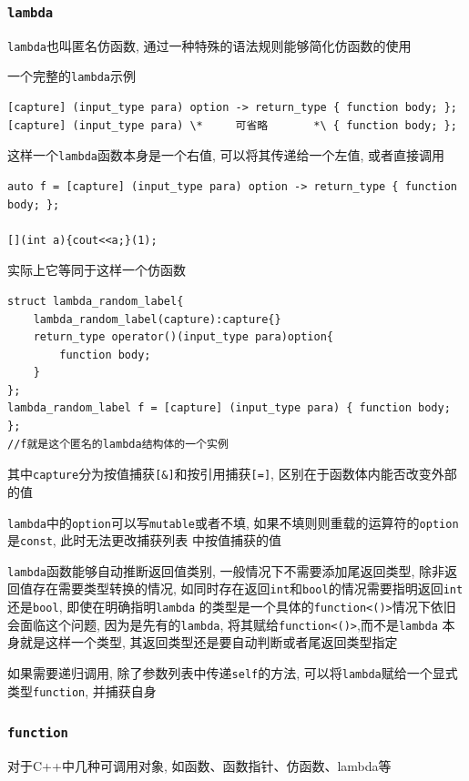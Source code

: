 \subsubsection{{\tt lambda}}
{\tt lambda}也叫匿名仿函数, 通过一种特殊的语法规则能够简化仿函数的使用

一个完整的{\tt lambda}示例
\begin{lstlisting}
[capture] (input_type para) option -> return_type { function body; };
[capture] (input_type para) \*     可省略       *\ { function body; };
\end{lstlisting}
这样一个{\tt lambda}函数本身是一个右值, 可以将其传递给一个左值, 或者直接调用
\begin{lstlisting}
auto f = [capture] (input_type para) option -> return_type { function body; };

[](int a){cout<<a;}(1);
\end{lstlisting}

实际上它等同于这样一个仿函数

\begin{lstlisting}
struct lambda_random_label{
	lambda_random_label(capture):capture{}
	return_type operator()(input_type para)option{
		function body;
	}
};
lambda_random_label f = [capture] (input_type para) { function body; };
//f就是这个匿名的lambda结构体的一个实例
\end{lstlisting}

其中{\tt capture}分为按值捕获{\tt[\&]}和按引用捕获{\tt[=]}, 区别在于函数体内能否改变外部的值

{\tt lambda}中的{\tt option}可以写{\tt mutable}或者不填, 如果不填则则重载的运算符的{\tt option}是{\tt const}, 此时无法更改捕获列表
	中按值捕获的值

{\tt lambda}函数能够自动推断返回值类别, 一般情况下不需要添加尾返回类型, 除非返回值存在需要类型转换的情况, 
	如同时存在返回{\tt int}和{\tt bool}的情况需要指明返回{\tt int}还是{\tt bool}, 即使在明确指明{\tt lambda}
	的类型是一个具体的{\tt function<()>}情况下依旧会面临这个问题, 因为是先有的{\tt lambda}, 将其赋给{\tt function<()>},而不是{\tt lambda}
	本身就是这样一个类型, 其返回类型还是要自动判断或者尾返回类型指定

如果需要递归调用, 除了参数列表中传递{\tt self}的方法, 可以将{\tt lambda}赋给一个显式类型{\tt function}, 并捕获自身
\subsubsection{{\tt function}}
对于C++中几种可调用对象, 如函数、函数指针、仿函数、lambda等


